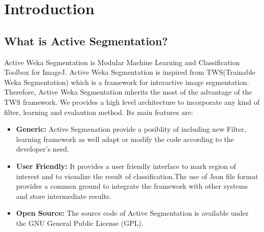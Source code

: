 \documentclass[a4paper,10pt]{article}
\begin{document}
	
	
	\tableofcontents
	\newpage
	\section{Introduction}\label{sec: intro}
	
	\subsection{What is Active Segmentation?}
	Active Weka Segmentation is Modular Machine Learning and Classification Toolbox for ImageJ. Active Weka Segmentation is inspired from TWS(Trainable Weka Segmentation) which is a framework for interactive image segmentation. Therefore, Active Weka Segmentation inherits the most of the advantage of the TWS framework. We provides a high level architecture to incorporate any kind of filter, learning and evalaution method.
	 Its main features are: 
	 \begin{itemize}
	 		\item \textbf{Generic: } Active Segmenation provide a posiblity of including new Filter, learning framework as well adapt or modify the code according to the developer's need.
	 		\item \textbf{User Friendly: } It provides a user friendly interface to mark region of interest and to visualize the result of classification.The use of Json file format provides a common ground to integrate the framework with other systems and store intermediate results.
	 		\item \textbf{Open Source: }The source code of Active Segmentation is available under the GNU General Public	License (GPL).
	 \end{itemize}
	 	
\end{document}
